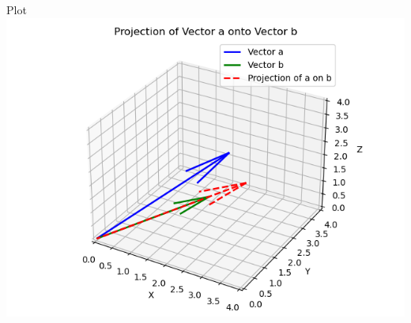 \documentclass{beamer}
\begin{document}
\begin{frame}{Plot}
    \centering
    \includegraphics[width=\columnwidth, height=0.8\textheight, keepaspectratio]{Figure_3.png}     
\end{frame}
\end{document}
